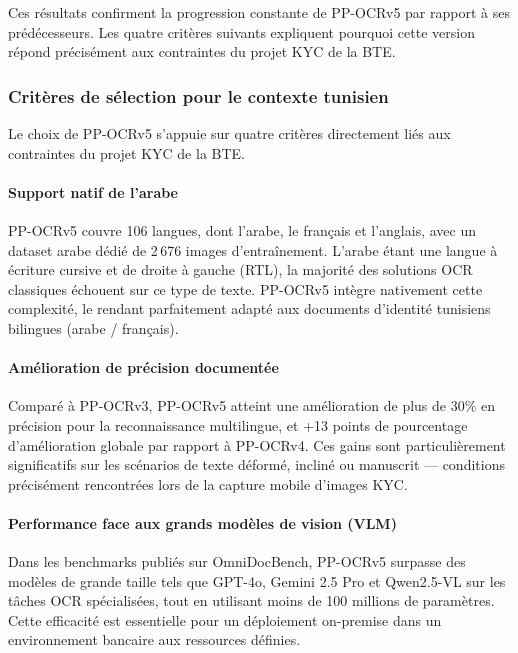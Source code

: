 Ces résultats confirment la progression constante de PP-OCRv5 par rapport à ses prédécesseurs. Les quatre critères suivants expliquent pourquoi cette version répond précisément aux contraintes du projet KYC de la BTE.

\subsubsection{Critères de sélection pour le contexte tunisien}

Le choix de PP-OCRv5 s'appuie sur quatre critères directement liés aux contraintes du projet KYC de la BTE.

\paragraph{Support natif de l'arabe}

PP-OCRv5 couvre 106 langues, dont l'arabe, le français et l'anglais, avec un dataset arabe dédié de 2\,676 images d'entraînement. L'arabe étant une langue à écriture cursive et de droite à gauche (RTL), la majorité des solutions OCR classiques échouent sur ce type de texte. PP-OCRv5 intègre nativement cette complexité, le rendant parfaitement adapté aux documents d'identité tunisiens bilingues (arabe / français).

\paragraph{Amélioration de précision documentée}

Comparé à PP-OCRv3, PP-OCRv5 atteint une amélioration de plus de 30\% en précision pour la reconnaissance multilingue, et +13 points de pourcentage d'amélioration globale par rapport à PP-OCRv4. Ces gains sont particulièrement significatifs sur les scénarios de texte déformé, incliné ou manuscrit --- conditions précisément rencontrées lors de la capture mobile d'images KYC.

\paragraph{Performance face aux grands modèles de vision (VLM)}

Dans les benchmarks publiés sur OmniDocBench, PP-OCRv5 surpasse des modèles de grande taille tels que GPT-4o, Gemini 2.5 Pro et Qwen2.5-VL sur les tâches OCR spécialisées, tout en utilisant moins de 100 millions de paramètres. Cette efficacité est essentielle pour un déploiement on-premise dans un environnement bancaire aux ressources définies.

